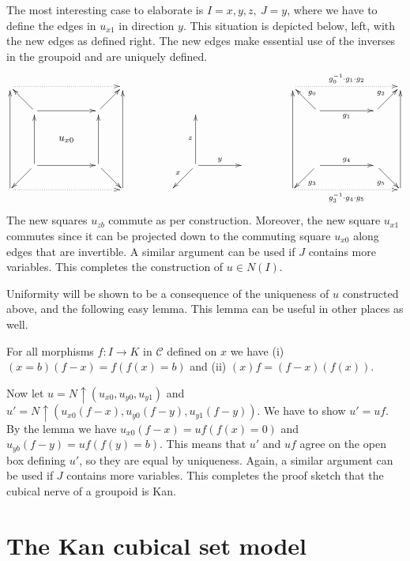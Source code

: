 \documentclass[a4paper,USenglish,draft]{lipics}
\newcommand{\CC}{{\mathcal C}}
\newcommand{\rup}[1]{#1{\uparrow}}
\begin{document}
The most interesting case to elaborate is $I=x,y,z,~J=y$, where we
have to define the edges in $u_{x1}$ in direction $y$.  This situation
is depicted below, left, with the new edges as defined right.  The new
edges make essential use of the inverses in the groupoid and are
uniquely defined.
\[
\xymatrix@R=.6cm@C=.6cm{
\ar@{.>}[rrrr]            &&&&         &
&&&&&         &
\ar@{.>}[rrrr]^{g_0^{-1}\cdot g_1\cdot g_2}           &&&&         \\
&\ar[lu]\ar[rr]        &&  \ar[ru]&   &
&&&&&   &
&\ar[lu]_{g_0} \ar[rr]_{g_1}         &&  \ar[ru]^{g_2} &   \\
&&u_{x0}&&                               &
&&&&&                               &
&&~~~&&                               \\
&\ar[ld]\ar[rr]\ar[uu]&&\ar[rd]\ar[uu]& &
&&\ar[ld]_x\ar[rr]^{y}\ar[uu]^z&&& &
&\ar[ld]^{g_3}\ar[rr]^{g_4}&&\ar[rd]_{g_5} & \\
\ar[uuuu]\ar@{.>}[rrrr]&&&&\ar[uuuu] &
&&&&&  &
\ar[uuuu]\ar@{.>}[rrrr]_{g_3^{-1}\cdot g_4\cdot g_5}&&&&\ar[uuuu]\\
}
\]
The new squares $u_{zb}$ commute as per construction.  Moreover, the
new square $u_{x1}$ commutes since it can be projected down to the
commuting square $u_{x0}$ along edges that are invertible.  A similar
argument can be used if $J$ contains more variables.  This completes
the construction of $u\in N(I)$.

Uniformity will be shown to be a consequence of the uniqueness of $u$
constructed above, and the following easy lemma.  This lemma can be
useful in other places as well.
\begin{lemma}
  For all morphisms $f:I\to K$ in $\CC$ defined on $x$ we have (i)
  $(x=b)(f-x) = f (f(x)=b)$ and (ii) $(x)f = (f-x)(f(x))$.
\end{lemma}
Now let $u=\rup{N}(u_{x0},u_{y0},u_{y1})$ and
$u'=\rup{N}(u_{x0}(f-x),u_{y0}(f-y),u_{y1}(f-y))$.  We have to show
$u'=uf$.  By the lemma we have $u_{x0}(f-x) = uf(f(x)=0)$ and
$u_{yb}(f-y) = uf(f(y)=b)$.  This means that $u'$ and $uf$ agree on
the open box defining $u'$, so they are equal by uniqueness.  Again, a
similar argument can be used if $J$ contains more variables.  This
completes the proof sketch that the cubical nerve of a groupoid is
Kan.

\section{The Kan cubical set model}\label{sec:kancubsetmodel}
\end{document}
